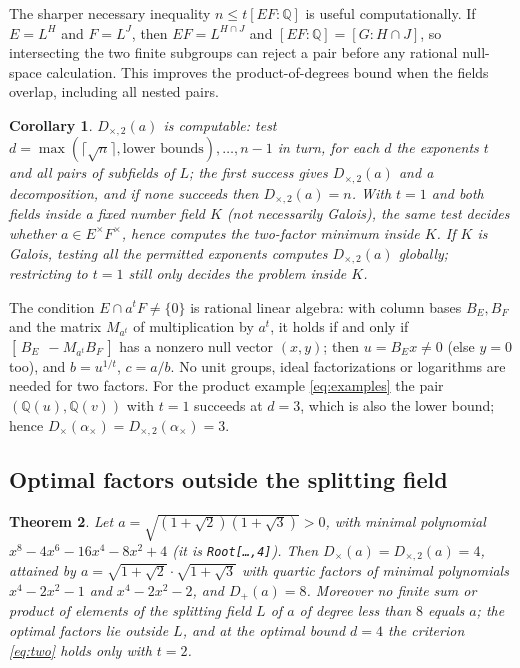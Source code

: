 \documentclass[11pt,a4paper]{article}
\newtheorem{theorem}{Theorem}[section]
\newtheorem{corollary}[theorem]{Corollary}
\theoremstyle{definition}
\theoremstyle{remark}
\newcommand{\Q}{\mathbb{Q}}
\newcommand{\Dp}{D_{+}}
\newcommand{\Dt}{D_{\times}}
\newcommand{\Dtt}{D_{\times,2}}
\newcommand{\code}[1]{\texttt{#1}}
\begin{document}
The sharper necessary inequality $n\le t[EF:\Q]$ is useful computationally.  If $E=L^H$ and $F=L^J$,
then $EF=L^{H\cap J}$ and $[EF:\Q]=[G:H\cap J]$, so intersecting the two finite subgroups can reject
a pair before any rational null-space calculation.  This improves the product-of-degrees bound when
the fields overlap, including all nested pairs.

\begin{corollary}\label{cor:two}
$\Dtt(a)$ is computable: test $d=\max(\lceil\sqrt n\rceil,\text{lower bounds}),\dots,n-1$ in turn, for
each $d$ the exponents $t$ and all pairs of subfields of $L$; the first success gives $\Dtt(a)$ and a
decomposition, and if none succeeds then $\Dtt(a)=n$.  With $t=1$ and both fields inside a fixed number
field $K$ (not necessarily Galois), the same test decides whether $a\in E^\times F^\times$, hence
computes the two-factor minimum inside $K$.  If $K$ is Galois, testing \emph{all} the permitted
exponents computes $\Dtt(a)$ globally; restricting to $t=1$ still only decides the problem inside $K$.
\end{corollary}

The condition $E\cap a^tF\ne\{0\}$ is rational linear algebra: with column bases $B_E,B_F$ and the
matrix $M_{a^t}$ of multiplication by $a^t$, it holds if and only if $[\,B_E\ \ -M_{a^t}B_F\,]$ has a
nonzero null vector $(x,y)$; then $u=B_Ex\ne0$ (else $y=0$ too), and $b=u^{1/t}$, $c=a/b$.  No unit
groups, ideal factorizations or logarithms are needed for two factors.  For the product example
\eqref{eq:examples} the pair $(\Q(u),\Q(v))$ with $t=1$ succeeds at $d=3$, which is also the lower
bound; hence $\Dt(\alpha_\times)=\Dtt(\alpha_\times)=3$.

\subsection{Optimal factors outside the splitting field}\label{sec:external}

\begin{theorem}\label{thm:external}
Let $a=\sqrt{(1+\sqrt2)(1+\sqrt3)}>0$, with minimal polynomial $x^8-4x^6-16x^4-8x^2+4$
(it is \code{Root[\ldots,4]}).  Then $\Dt(a)=\Dtt(a)=4$, attained by
$a=\sqrt{1+\sqrt2}\cdot\sqrt{1+\sqrt3}$ with quartic factors of minimal polynomials $x^4-2x^2-1$ and
$x^4-2x^2-2$, and $\Dp(a)=8$.  Moreover no finite sum or product of elements of the splitting field
$L$ of $a$ of degree less than $8$ equals $a$; the optimal factors lie outside $L$, and at the optimal
bound $d=4$ the criterion \eqref{eq:two} holds only with $t=2$.
\end{theorem}
\end{document}
